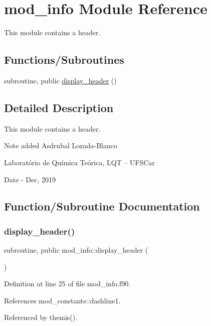 \hypertarget{namespacemod__info}{}\section{mod\+\_\+info Module Reference}
\label{namespacemod__info}


This module contains a header.  


\subsection*{Functions/\+Subroutines}
\begin{DoxyCompactItemize}
\item 
subroutine, public \hyperlink{namespacemod__info_aa386f2ec92c32e2df09330e7f4b23fe3}{display\+\_\+header} ()
\end{DoxyCompactItemize}


\subsection{Detailed Description}
This module contains a header. 

\begin{DoxyNote}{Note}
added Asdrubal Lozada-\/\+Blanco
\begin{DoxyItemize}
\item Laboratório de Química Teórica, L\+QT -- U\+F\+S\+Car 
\end{DoxyItemize}
\end{DoxyNote}
\begin{DoxyDate}{Date}
-\/ Dec, 2019 
\end{DoxyDate}


\subsection{Function/\+Subroutine Documentation}
\mbox{\label{namespacemod__info_aa386f2ec92c32e2df09330e7f4b23fe3}} 
\subsubsection{\texorpdfstring{display\+\_\+header()}{display\_header()}}
{\footnotesize\ttfamily subroutine, public mod\+\_\+info\+::display\+\_\+header (\begin{DoxyParamCaption}{ }\end{DoxyParamCaption})}



Definition at line 25 of file mod\+\_\+info.\+f90.



References mod\+\_\+constants\+::dashline1.



Referenced by themis().


